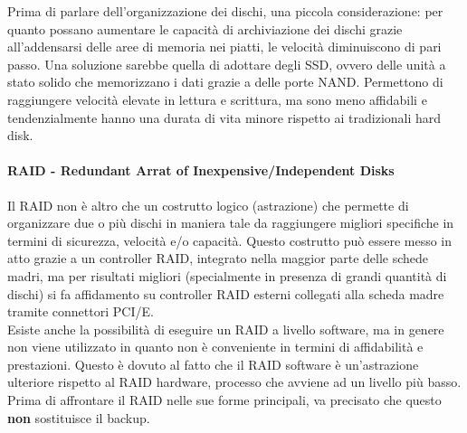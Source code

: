 \documentclass[a4paper]{report}
\begin{document}
Prima di parlare dell'organizzazione dei dischi, una piccola considerazione: per quanto possano aumentare le capacità di archiviazione dei dischi grazie all'addensarsi delle aree di memoria nei piatti, le velocità diminuiscono di pari passo. Una soluzione sarebbe quella di adottare degli SSD, ovvero delle unità a stato solido che memorizzano i dati grazie a delle porte NAND. Permettono di raggiungere velocità elevate in lettura e scrittura, ma sono meno affidabili e tendenzialmente hanno una durata di vita minore rispetto ai tradizionali hard disk.
\paragraph{RAID - Redundant Arrat of Inexpensive/Independent Disks} Il RAID non è altro che un costrutto logico (astrazione) che permette di organizzare due o più dischi in maniera tale da raggiungere migliori specifiche in termini di sicurezza, velocità e/o capacità. Questo costrutto può essere messo in atto grazie a un controller RAID, integrato nella maggior parte delle schede madri, ma per risultati migliori (specialmente in presenza di grandi quantità di dischi) si fa affidamento su controller RAID esterni collegati alla scheda madre tramite connettori PCI/E.\\
Esiste anche la possibilità di eseguire un RAID a livello software, ma in genere non viene utilizzato in quanto non è conveniente in termini di affidabilità e prestazioni. Questo è dovuto al fatto che il RAID software è un'astrazione ulteriore rispetto al RAID hardware, processo che avviene ad un livello più basso.\\
Prima di affrontare il RAID nelle sue forme principali, va precisato che questo \textbf{non} sostituisce il backup.
\end{document}
